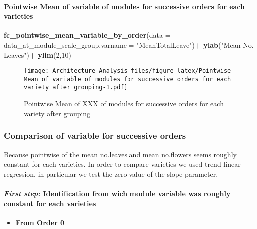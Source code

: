 \documentclass[]{article}
\newenvironment{Shaded}{\begin{snugshade}}{\end{snugshade}}
\newcommand{\KeywordTok}[1]{\textcolor[rgb]{0.13,0.29,0.53}{\textbf{#1}}}
\newcommand{\DataTypeTok}[1]{\textcolor[rgb]{0.13,0.29,0.53}{#1}}
\newcommand{\DecValTok}[1]{\textcolor[rgb]{0.00,0.00,0.81}{#1}}
\newcommand{\StringTok}[1]{\textcolor[rgb]{0.31,0.60,0.02}{#1}}
\newcommand{\OperatorTok}[1]{\textcolor[rgb]{0.81,0.36,0.00}{\textbf{#1}}}
\newcommand{\NormalTok}[1]{#1}
\providecommand{\tightlist}{%
  \setlength{\itemsep}{0pt}\setlength{\parskip}{0pt}}
\let\oldparagraph\paragraph
\renewcommand{\paragraph}[1]{\oldparagraph{#1}\mbox{}}
\begin{document}
\paragraph{Pointwise Mean of variable of modules for successive orders
for each
varieties}\label{pointwise-mean-of-variable-of-modules-for-successive-orders-for-each-varieties}

\begin{Shaded}
\begin{Highlighting}[]
\KeywordTok{fc_pointwise_mean_variable_by_order}\NormalTok{(}\DataTypeTok{data =}\NormalTok{ data_at_module_scale_group,}\DataTypeTok{varname =} \StringTok{"MeanTotalLeave"}\NormalTok{)}\OperatorTok{+}
\StringTok{  }\KeywordTok{ylab}\NormalTok{(}\StringTok{"Mean No. Leaves"}\NormalTok{)}\OperatorTok{+}
\StringTok{  }\KeywordTok{ylim}\NormalTok{(}\DecValTok{2}\NormalTok{,}\DecValTok{10}\NormalTok{)}
\end{Highlighting}
\end{Shaded}

\begin{figure}
\centering
\texttt{[image: Architecture\_Analysis\_files/figure-latex/Pointwise Mean of variable of modules for successive orders for each variety after grouping-1.pdf]}
\caption{Pointwise Mean of XXX of modules for successive orders for each
variety after grouping}
\end{figure}

\subsubsection{Comparison of variable for successive
orders}\label{comparison-of-variable-for-successive-orders}

Because pointwise of the mean no.leaves and mean no.flowers seems
roughly constant for each varieties. In order to compare varieties we
used trend linear regression, in particular we test the zero value of
the slope parameter.

\paragraph{\texorpdfstring{\emph{First step:} Identification from wich
module variable was roughly constant for each
varieties}{First step: Identification from wich module variable was roughly constant for each varieties}}\label{first-step-identification-from-wich-module-variable-was-roughly-constant-for-each-varieties}

\begin{itemize}
\tightlist
\item
  \textbf{From Order 0}
\end{itemize}
\end{document}
